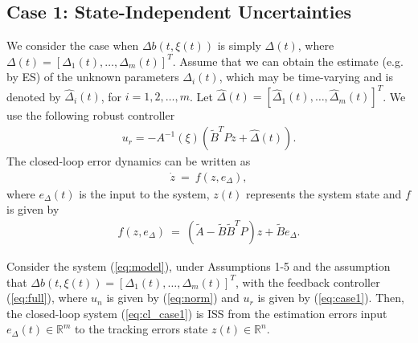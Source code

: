 \documentclass[twoside,leqno,onecolumn]{article}
\begin{document}
\subsection{Case 1: State-Independent Uncertainties}
\label{sec:case1} We consider the case when $\Delta b(t,\xi(t))$
is simply $\Delta(t) $, where $\Delta(t)  =
[\Delta_1(t),\dots,\Delta_m(t)]^T$. Assume that we can obtain the
estimate (e.g. by ES) of the unknown parameters $\Delta_i(t)$,
which may be time-varying and is denoted by $\widehat{\Delta }_i
(t)$, for $i = 1,2,\dots,m$.  Let $\widehat{\Delta }(t) =
[\widehat{\Delta } _1(t),\dots,\widehat{\Delta } _m(t)]^T$.
We use the following robust controller
\begin{align}
\label{eq:case1}
u_{r} = - A^{-1}(\xi) (\tilde B^TPz+ \widehat{\Delta}(t)).
\end{align}
The closed-loop error dynamics can be written as
\begin{align}
\label{eq:cl_case1} \dot{z}~=~f(z,e_\Delta),
\end{align}
where $e_\Delta(t)$ is the input to the system, $z(t)$ represents
the system state and $f$ is given by
\begin{align*}
f(z,e_\Delta)~=~(\tilde{A} - \tilde{B} \tilde B^TP)z + \tilde B
e_\Delta.
\end{align*}
\begin{theorem}
\label{thm:case1} Consider the system (\ref{eq:model}), under
Assumptions 1-5 and the assumption that $\Delta b(t,\xi(t)) =
[\Delta_1(t),\dots,\Delta_m(t)]^T$, with the feedback controller
(\ref{eq:full}), where $u_n$ is given by (\ref{eq:norm}) and $u_r$
is given by (\ref{eq:case1}). Then, the closed-loop system
(\ref{eq:cl_case1}) is ISS from the estimation errors input
$e_\Delta(t)\in\mathbb{R}^m$
 to the tracking errors state $z(t)\in\mathbb{R}^n$.
\end{theorem}
\end{document}

